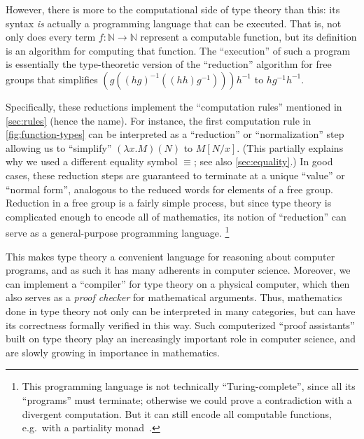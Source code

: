 \documentclass[12pt]{article}
\let\jdeq\equiv
\def\N{\mathbb{N}}
\def\equiv{\mathsf{Equiv}}
\numberwithin{equation}{section}
\begin{document}
However, there is more to the computational side of type theory than this: its syntax \emph{is} actually a programming language that can be executed.
That is, not only does every term $f:\N\to\N$ represent a computable function, but its definition is an algorithm for computing that function.
The ``execution'' of such a program is essentially the type-theoretic version of the ``reduction'' algorithm for free groups that simplifies $(g((hg)^{-1}((hh)g^{-1})))h^{-1}$ to $hg^{-1}h^{-1}$.

Specifically, these reductions implement the ``computation rules'' mentioned in \cref{sec:rules} (hence the name).
For instance, the first computation rule in \cref{fig:function-types} can be interpreted as a ``reduction'' or ``normalization'' step allowing us to ``simplify'' $(\lambda x.M)(N)$ to $M[N/x]$.
(This partially explains why we used a different equality symbol $\jdeq$; see also \cref{sec:equality}.)
In good cases, these reduction steps are guaranteed to terminate at a unique ``value'' or ``normal form'', analogous to the reduced words for elements of a free group.
Reduction in a free group is a fairly simple process, but since type theory is complicated enough to encode all of mathematics, its notion of ``reduction'' can serve as a general-purpose programming language.%
\footnote{This programming language is not technically ``Turing-complete'', since all its ``programs'' must terminate; otherwise we could prove a contradiction with a divergent computation.
But it can still encode all computable functions, e.g.\ with a partiality monad~\cite{capretta:genrec-coind,danielsson:opsem-partiality}.}

This makes type theory a convenient language for reasoning about computer programs, and as such it has many adherents in computer science.
Moreover, we can implement a ``compiler'' for type theory on a physical computer, which then also serves as a \emph{proof checker} for mathematical arguments.
Thus, mathematics done in type theory not only can be interpreted in many categories, but can have its correctness formally verified in this way.
Such computerized ``proof assistants'' built on type theory play an increasingly important role in computer science, and are slowly growing in importance in mathematics.
\end{document}
